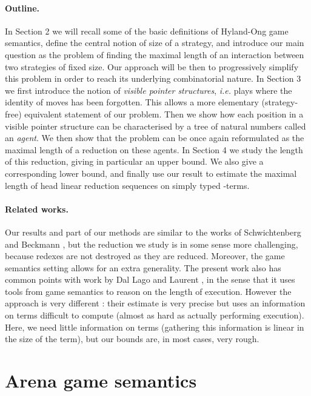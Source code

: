 \documentclass{article}
\begin{document}
\paragraph{Outline.} In Section 2 we will recall some of the basic definitions of Hyland-Ong game semantics, define the central notion of size of a strategy, and introduce our main question as the problem of finding 
the maximal length of an interaction between two strategies of fixed size. Our approach will be then to progressively simplify this problem in order to reach its underlying combinatorial nature. In Section 3
we first introduce the notion of \emph{visible pointer structures}, \emph{i.e.} plays where the identity of moves has been forgotten. This allows a more elementary (strategy-free) equivalent statement of our problem.
Then we show how each position in a visible pointer structure can be characterised by a tree of natural numbers called an \emph{agent}. We then show that the problem can be once again reformulated as the maximal length of
a reduction on these agents. In Section 4 we study the length of this reduction, giving in particular an upper bound. We also give a corresponding lower bound, and finally use our result to estimate
the maximal length of head linear reduction sequences on simply typed -terms.

\paragraph{Related works.} Our results and part of our methods are similar to the works of Schwichtenberg and Beckmann \cite{schwichtenberg1982complexity,beckmann2001exact}, but the reduction we study is in some sense more
challenging, because redexes are not
destroyed as they are reduced. Moreover, the game semantics setting allows for an extra generality. The present work also has common points with work by Dal Lago and Laurent \cite{DBLP:conf/csl/LagoL08}, in the sense that it uses
tools from game semantics to reason on the length of execution. However the approach is very different : their estimate is very precise but uses an information on terms difficult to compute (almost as hard as actually performing
execution). Here, we need little information on terms (gathering this information is linear in the size of the term), but our bounds are, in most cases, very rough.

\section{Arena game semantics}
\label{section_games}
\end{document}
